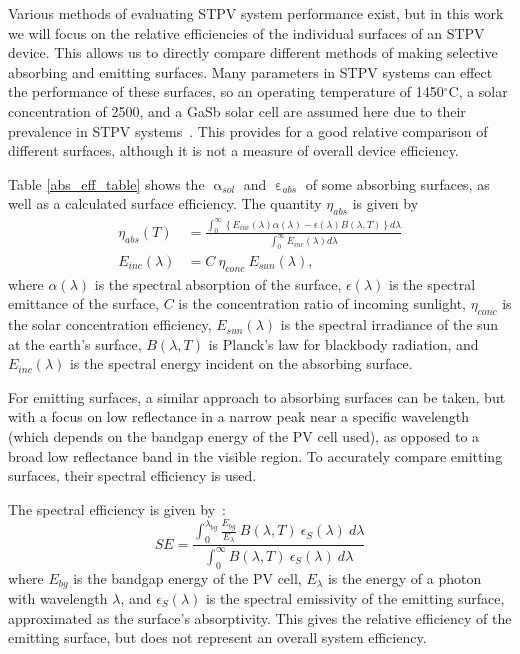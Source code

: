 \documentclass[review]{elsarticle}
\begin{document}
Various methods of evaluating STPV system performance exist, but in this work we will focus on the relative efficiencies of the individual surfaces of an STPV device.  This allows us to directly compare different methods of making selective absorbing and emitting surfaces.  Many parameters in STPV systems can effect the performance of these surfaces, so an operating temperature of 1450$^\circ$C, a solar concentration of 2500, and a GaSb solar cell are assumed here due to their prevalence in STPV systems~\cite{exp_tokyo,exp_madrid,exp_russia,me1,me2,RF_OptExp_2009}.  This provides for a good relative comparison of different surfaces, although it is not a measure of overall device efficiency.

Table \ref{abs_eff_table} shows the $\upalpha_{sol}$ and $\upepsilon_{abs}$ of some absorbing surfaces, as well as a calculated surface efficiency.  The quantity $\eta_{abs}$ is given by
\begin{align}
\label{overall_sss_eq}\eta_{abs}(T)& = \frac{\int_{0}^{\infty}\left\{E_{inc}(\lambda)\alpha(\lambda)-\epsilon(\lambda)B(\lambda,T)\right\}d\lambda}{\int_{0}^{\infty}E_{inc}(\lambda)d\lambda}\\
\label{e_incident}E_{inc}(\lambda) &= C \: \eta_{conc} \: E_{sun}(\lambda),
\end{align}
where $\alpha(\lambda)$ is the spectral absorption of the surface, $\epsilon(\lambda)$ is the spectral emittance of the surface, $C$ is the concentration ratio of incoming sunlight, 
$\eta_{conc}$ is the solar concentration efficiency, $E_{sun}(\lambda)$ is the 
spectral irradiance of the sun at the earth's surface, $B(\lambda, T)$ is 
Planck's law for blackbody radiation, and $E_{inc}(\lambda)$ is the spectral 
energy incident on the absorbing surface.

For emitting surfaces, a similar approach to absorbing surfaces can be taken, but with a focus on low reflectance in a narrow peak near a specific wavelength (which depends on the bandgap energy of the PV cell used), as opposed to a broad low reflectance band in the visible region.  To accurately compare emitting surfaces, their spectral efficiency is used.

The spectral efficiency is given by~\cite{me2}:
\begin{equation}\label{SpecEff}
SE = \frac{  \int_0^{\lambda_{bg}} \frac{ E_{bg} }{E_{\lambda}} \: B(\lambda, T) \: \epsilon_S (\lambda) \: d\lambda }
{\int_0^{\infty} B(\lambda,T) \: \epsilon_S (\lambda) \: d\lambda}
\end{equation}
where $E_{bg}$ is the bandgap energy of the PV cell, $E_{\lambda}$ is the energy of a photon with wavelength $\lambda$, and $\epsilon_S (\lambda)$ is the spectral emissivity of the emitting surface, approximated as the surface's absorptivity.  This gives the relative efficiency of the emitting surface, but does not represent an overall system efficiency.
\end{document}

